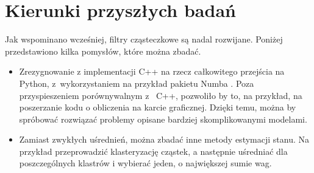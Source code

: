 \section{Kierunki przyszłych badań}
Jak wspominano wcześniej, filtry cząsteczkowe są nadal rozwijane. Poniżej przedstawiono kilka pomysłów, które można zbadać.
\begin{itemize}
	\item Zrezygnowanie z implementacji C++ na rzecz całkowitego przejścia na Python, z~wykorzystaniem na przykład pakietu Numba \cite{numba}. Poza przyspieszeniem porównywalnym z~ C++, pozwoliło by to, na przykład, na poszerzanie kodu o obliczenia na karcie graficznej. Dzięki temu, można by spróbować rozwiązać problemy opisane bardziej skomplikowanymi modelami.
	\item Zamiast zwykłych uśrednień, można zbadać inne metody estymacji stanu. Na przykład przeprowadzić klasteryzację cząstek, a następnie uśredniać dla poszczególnych klastrów i wybierać jeden, o największej sumie wag.
\end{itemize}